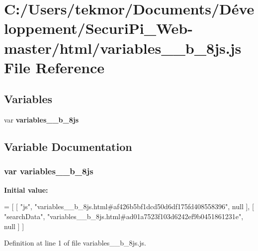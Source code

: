 \section{C\+:/\+Users/tekmor/\+Documents/\+Développement/\+Securi\+Pi\+\_\+\+Web-\/master/html/variables\+\_\+\+\_\+b\+\_\+8js.js File Reference}
\label{variables____b__8js_8js}
\subsection*{Variables}
\begin{DoxyCompactItemize}
\item 
var {\bf variables\+\_\+\+\_\+b\+\_\+8js}
\end{DoxyCompactItemize}


\subsection{Variable Documentation}
\subsubsection[{variables\+\_\+\+\_\+b\+\_\+8js}]{\setlength{\rightskip}{0pt plus 5cm}var variables\+\_\+\+\_\+b\+\_\+8js}\label{variables____b__8js_8js_ac2160bf89931ced4216af07bb85fa6b4}
{\bfseries Initial value\+:}
\begin{DoxyCode}
=
[
    [ \textcolor{stringliteral}{"js"}, \textcolor{stringliteral}{"variables\_\_b\_8js.html#af426b5bf1dcd50d6df175fd408558396"}, null ],
    [ \textcolor{stringliteral}{"searchData"}, \textcolor{stringliteral}{"variables\_\_b\_8js.html#ad01a7523f103d6242ef9b0451861231e"}, null ]
]
\end{DoxyCode}


Definition at line 1 of file variables\+\_\+\+\_\+b\+\_\+8js.\+js.

